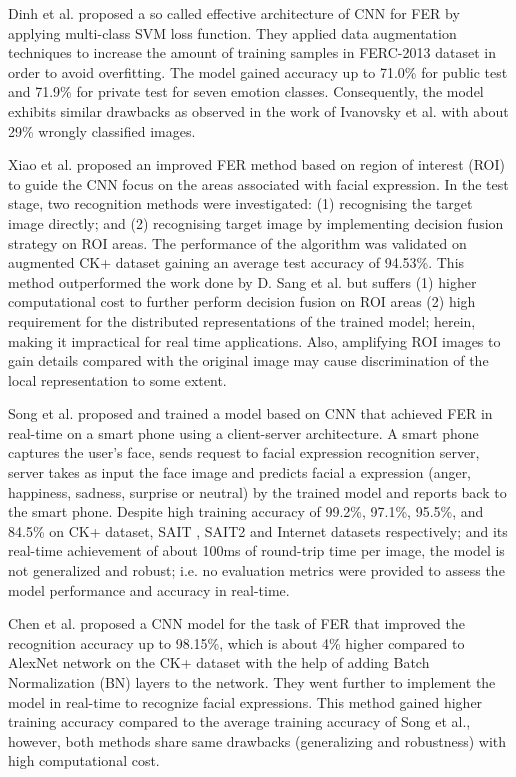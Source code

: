 \documentclass[master]{thesis-uestc}
\begin{document}
Dinh et al. proposed a so called effective architecture of CNN for FER by applying multi-class SVM loss function. They applied data augmentation techniques to increase the amount of training samples in FERC-2013 dataset in order to avoid overfitting. The model gained accuracy up to 71.0\% for public test and 71.9\% for private test for seven emotion classes. Consequently, the model exhibits similar drawbacks as observed in the work of Ivanovsky et al. with about 29\% wrongly classified images.

Xiao et al. proposed an improved FER method based on region of interest (ROI) to guide the CNN focus on the areas associated with facial expression. In the test stage, two recognition methods were investigated: (1) recognising the target image directly; and (2) recognising target image by implementing decision fusion strategy on ROI areas.  The performance of the algorithm was validated on augmented CK+ dataset  gaining an average test accuracy of 94.53\%. This method outperformed the work done by D. Sang et al. but suffers (1) higher computational cost to further perform decision fusion on ROI areas (2) high requirement for the distributed representations of the trained model; herein, making it impractical for real time applications. Also, amplifying ROI images to gain details compared with the original image may cause discrimination of the local representation to some extent.

Song et al. proposed and trained a model based on CNN that achieved FER in real-time on a smart phone using a client-server architecture. A smart phone captures the user's face, sends request to facial expression recognition server, server takes as input the face image and predicts facial a expression (anger, happiness, sadness, surprise or neutral) by the trained model and reports back to the smart phone. Despite high training accuracy of 99.2\%, 97.1\%, 95.5\%, and 84.5\% on CK+ dataset, SAIT , SAIT2  and Internet  datasets respectively; and its real-time achievement of about 100ms of round-trip time per image, the model is  not generalized and robust; i.e. no evaluation metrics were provided to assess the model performance and accuracy in real-time.

Chen et al. proposed a CNN model for the task of FER that improved the recognition accuracy up to 98.15\%, which is about 4\% higher compared to AlexNet network on the CK+ dataset with the help of adding Batch Normalization (BN) layers to the network. They went further to implement the model in real-time to recognize facial expressions. This method gained higher training accuracy compared to the average training accuracy of Song et al., however, both methods share same drawbacks (generalizing and robustness) with high computational cost.
\end{document}
